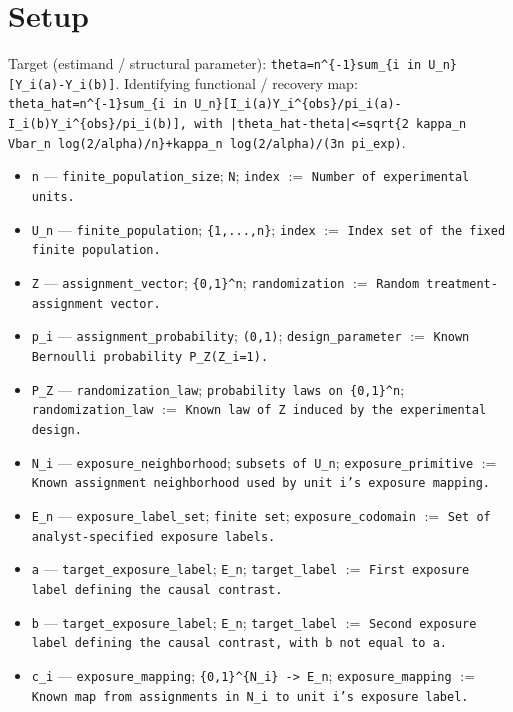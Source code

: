 \documentclass{article}
\begin{document}
\section{Setup}

Target (estimand / structural parameter): \texttt{theta=n\textasciicircum{}\{-1\}sum\_\{i in U\_n\}[Y\_i(a)-Y\_i(b)]}.
Identifying functional / recovery map: \texttt{theta\_hat=n\textasciicircum{}\{-1\}sum\_\{i in U\_n\}[I\_i(a)Y\_i\textasciicircum{}\{obs\}/pi\_i(a)-I\_i(b)Y\_i\textasciicircum{}\{obs\}/pi\_i(b)], with |theta\_hat-theta|<=sqrt\{2 kappa\_n Vbar\_n log(2/alpha)/n\}+kappa\_n log(2/alpha)/(3n pi\_exp)}.
\begin{itemize}
  \item \texttt{n} --- \texttt{finite\_population\_size}; \texttt{N}; \texttt{index} $:=$ \texttt{Number of experimental units.}
  \item \texttt{U\_n} --- \texttt{finite\_population}; \texttt{\{1,...,n\}}; \texttt{index} $:=$ \texttt{Index set of the fixed finite population.}
  \item \texttt{Z} --- \texttt{assignment\_vector}; \texttt{\{0,1\}\textasciicircum{}n}; \texttt{randomization} $:=$ \texttt{Random treatment-assignment vector.}
  \item \texttt{p\_i} --- \texttt{assignment\_probability}; \texttt{(0,1)}; \texttt{design\_parameter} $:=$ \texttt{Known Bernoulli probability P\_Z(Z\_i=1).}
  \item \texttt{P\_Z} --- \texttt{randomization\_law}; \texttt{probability laws on \{0,1\}\textasciicircum{}n}; \texttt{randomization\_law} $:=$ \texttt{Known law of Z induced by the experimental design.}
  \item \texttt{N\_i} --- \texttt{exposure\_neighborhood}; \texttt{subsets of U\_n}; \texttt{exposure\_primitive} $:=$ \texttt{Known assignment neighborhood used by unit i's exposure mapping.}
  \item \texttt{E\_n} --- \texttt{exposure\_label\_set}; \texttt{finite set}; \texttt{exposure\_codomain} $:=$ \texttt{Set of analyst-specified exposure labels.}
  \item \texttt{a} --- \texttt{target\_exposure\_label}; \texttt{E\_n}; \texttt{target\_label} $:=$ \texttt{First exposure label defining the causal contrast.}
  \item \texttt{b} --- \texttt{target\_exposure\_label}; \texttt{E\_n}; \texttt{target\_label} $:=$ \texttt{Second exposure label defining the causal contrast, with b not equal to a.}
  \item \texttt{c\_i} --- \texttt{exposure\_mapping}; \texttt{\{0,1\}\textasciicircum{}\{N\_i\} -> E\_n}; \texttt{exposure\_mapping} $:=$ \texttt{Known map from assignments in N\_i to unit i's exposure label.}

\end{itemize}
\end{document}
